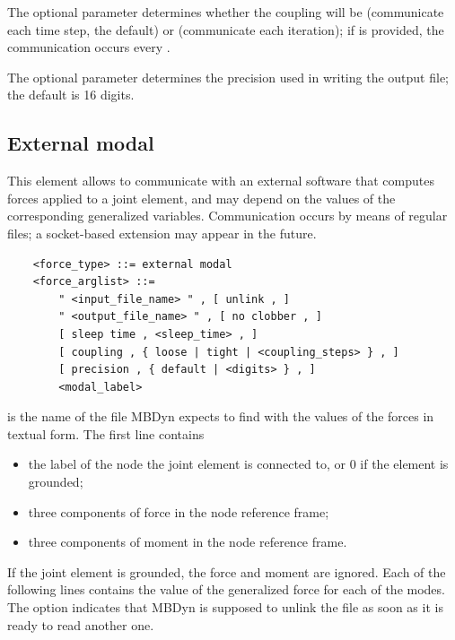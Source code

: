 The optional parameter  determines whether the coupling
will be  (communicate each time step, the default) or
 (communicate each iteration); if  is provided,
the communication occurs every .

The optional parameter  determines the precision
used in writing the output file; the default is 16 digits.




\subsection{External modal}
This element allows to communicate with an external software that computes
forces applied to a 
 joint element,
and may depend on the values of the corresponding generalized variables.
Communication occurs by means of regular files; a socket-based extension
may appear in the future.
\begin{verbatim}
    <force_type> ::= external modal
    <force_arglist> ::=
        " <input_file_name> " , [ unlink , ]
        " <output_file_name> " , [ no clobber , ]
        [ sleep time , <sleep_time> , ]
        [ coupling , { loose | tight | <coupling_steps> } , ]
        [ precision , { default | <digits> } , ]
        <modal_label>
\end{verbatim}

 is the name of the file MBDyn expects to find
with the values of the forces in textual form.
The first line contains
\begin{itemize}
\item the label of the  node the  joint element
	is connected to, or 0 if the element is grounded;
\item three components of force in the  node reference frame;
\item three components of moment in the  node reference frame.
\end{itemize}
If the  joint element is grounded, the force and moment
are ignored.
Each of the following lines contains the value of the generalized force
for each of the modes.
The option  indicates that MBDyn is supposed to unlink
the file as soon as it is ready to read another one.

